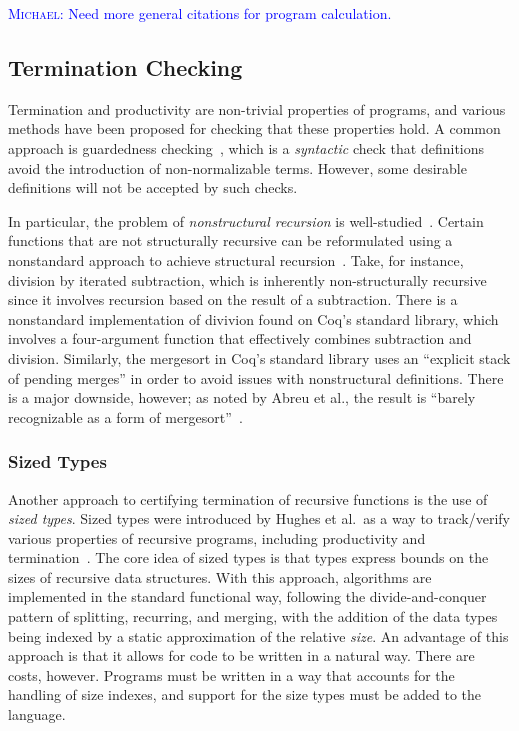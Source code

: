 \documentclass[a4paper, UKenglish, cleveref, autoref, thm-restate]{lipics-v2021}
\newcommand{\mvol}[1]{\textcolor{blue}{\textsc{Michael}: #1}}
\begin{document}
\mvol{Need more general citations for program calculation.}

\subsection{Termination Checking}

Termination and productivity are non-trivial properties of programs, and various
methods have been proposed for checking that these properties hold. A common
approach is guardedness checking~\cite{10.5555/646535.695850}, which is a
\emph{syntactic} check that definitions avoid the introduction of
non-normalizable terms. However, some desirable definitions will not be accepted
by such checks.

In particular, the problem of \emph{nonstructural recursion} is
well-studied~\cite{BOVE_KRAUSS_SOZEAU_2016}.
Certain functions that are not structurally recursive can be reformulated using
a nonstandard approach to achieve structural recursion~\cite{AbreuDHJMS23}.
Take, for instance, division by iterated subtraction, which is inherently
non-structurally recursive since it involves recursion based on the result of a
subtraction. There is a nonstandard implementation of divivion found on Coq's
standard library, which involves a four-argument function that effectively
combines subtraction and division. Similarly, the mergesort in Coq's standard
library uses an ``explicit stack of pending merges'' in order to avoid issues
with nonstructural definitions. There is a major downside, however; as noted by
Abreu et al., the result is ``barely recognizable as a form of
mergesort''~\cite{AbreuDHJMS23}.

\subsubsection{Sized Types}

Another approach to certifying termination of recursive functions is the use of
\emph{sized types}. Sized types were introduced by Hughes et al.\ as a way to
track/verify various properties of recursive programs, including productivity
and termination~\cite{HughesPS96}. The core idea of sized types is that types
express bounds on the sizes of recursive data structures. With this approach,
algorithms are implemented in the standard functional way, following the
divide-and-conquer pattern of splitting, recurring, and merging, with the
addition of the data types being indexed by a static approximation of the
relative \emph{size}. An advantage of this approach is that it allows for code
to be written in a natural way. There are costs, however. Programs must be
written in a way that accounts for the handling of size indexes, and support for
the size types must be added to the language.
\end{document}

